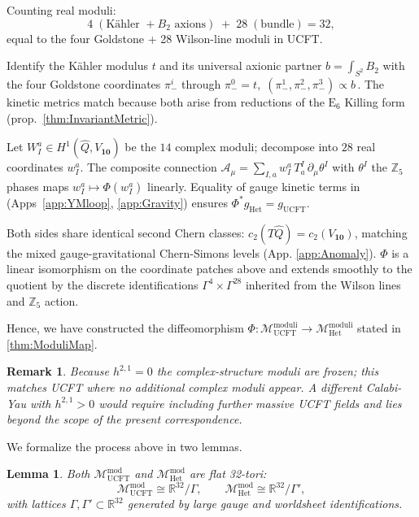 \documentclass[pdflatex,sn-mathphys-num]{sn-jnl}
\theoremstyle{thmstyleone}
\newtheorem{lemma}[lemma]{Lemma}
\theoremstyle{thmstyletwo}%
\newtheorem{remark}{Remark}%
\theoremstyle{thmstylethree}%
\newcommand{\E}[1]{\mathrm{E_{#1}}}
\newcommand{\ESix}{\E{6}}
\begin{document}
\begin{appendices}
Counting real moduli:
\[
  4\;(\text{K\"ahler }+B_{2}\text{ axions})
  \;+\;
  28\;(\text{bundle}) = 32,
\]
equal to the four Goldstone + 28 Wilson-line moduli in UCFT.

Identify the Kähler modulus $t$ and its universal axionic partner
$b=\int_{S^{2}}B_{2}$ with the four Goldstone coordinates
\(\pi_-^{i}\) through
\(
  \pi_-^{0}=t,\;
  (\pi_-^{1},\pi_-^{2},\pi_-^{3}) \propto b\,.
\)
The kinetic metrics match because both arise from reductions of the
$\ESix$ Killing form (prop.\ \ref{thm:InvariantMetric}).

Let
\(
  W^{a}_{I}\in H^{1}(\widehat Q,V_{\mathbf{10}})
\)
be the $14$ complex moduli; decompose into $28$ real coordinates
\(w^{a}_{I}\).
The composite connection
\(
  \mathcal A_\mu
 =\sum_{I,a}w^{a}_{I}\,T^{I}_{a}\,\partial_\mu\theta^{I}
\)
with \(\theta^{I}\) the $\mathbb Z_{5}$ phases maps
\(w^{a}_{I}\mapsto\Phi(w^{a}_{I})\) linearly.
Equality of gauge kinetic terms in
(Apps~\ref{app:YMloop}, \ref{app:Gravity}) ensures
\(\Phi^{*}g_{\text{Het}} = g_{\text{UCFT}}\).

Both sides share identical second Chern classes:
\(
  c_{2}(T\widehat Q)=c_{2}(V_{\mathbf{10}})
\),
matching the mixed gauge-gravitational Chern-Simons levels
(App. \ref{app:Anomaly}). $\Phi$ is a linear isomorphism on the coordinate patches above and extends smoothly to the quotient by the discrete identifications
\(\Gamma^{4}\times\Gamma^{28}\) inherited from the Wilson lines and
\(\mathbb Z_{5}\) action.

Hence, we have constructed the diffeomorphism
\(
  \Phi:\mathcal M_{\text{UCFT}}^{\text{moduli}}
  \to
  \mathcal M_{\text{Het}}^{\text{moduli}}
\)
stated in \autoref{thm:ModuliMap}.

\begin{remark}
Because \(h^{2,1}=0\) the complex-structure moduli are frozen; this
matches UCFT where no additional complex moduli appear.  A different
Calabi-Yau with
\(h^{2,1}>0\) would require including further massive UCFT fields and
lies beyond the scope of the present correspondence.
\end{remark}

We formalize the process above in two lemmas.

\begin{lemma}\label{lem:FlatTori}
Both
  \(\mathcal{M}_{\mathrm{UCFT}}^{\mathrm{mod}}\) and
  \(\mathcal{M}_{\mathrm{Het}}^{\mathrm{mod}}\)
are flat 32-tori:
\[
  \mathcal{M}_{\mathrm{UCFT}}^{\mathrm{mod}}
  \cong \mathbb R^{32}/\Gamma,
  \qquad
  \mathcal{M}_{\mathrm{Het}}^{\mathrm{mod}}
  \cong \mathbb R^{32}/\Gamma',
\]
with lattices \(\Gamma,\Gamma'\subset\mathbb R^{32}\) generated by
large gauge and worldsheet identifications.
\end{lemma}


\end{appendices}
\end{document}
